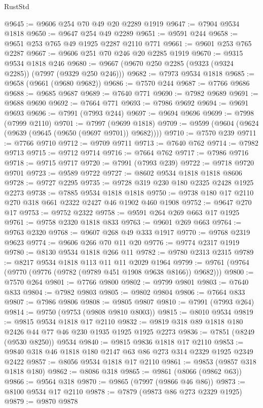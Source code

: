 \begin{lexlean}{RustStd}
\begin{coremodule}
{\begin{coremodule}
{{{{{{{{{{{{{{{{{{{{{{{{{{{{{{{{{{{{{{{{{{{@9645 := @9606 @254 @70 @49 @20 @2289 @1919
@9647 := @7904 @9534 @1818
@9650 := @9647 @254 @49 @2289
@9651 := @9591 @244
@9658 := @9651 @253 @765 @49 @1925 @2287 @2110 @771
@9661 := @9601 @253 @765 @2287
@9667 := @9606 @251 @70 @246 @20 @2285 @1919
@9670 := @9315 @9534 @1818 @246
@9680 := @9667 (@9670 @250 @2285 (@9323 (@9324 @2285)) (@7997 (@9329 @250 @246)))
@9682 := @7973 @9534 @1818
@9685 := @9658 (@9661 (@9680 @9682))
@9686 := @7570 @244
@9687 := @7766 @9686
@9688 := @9685 @9687
@9689 := @7640 @771
@9690 := @7982 @9689
@9691 := @9688 @9690
@9692 := @7664 @771
@9693 := @7986 @9692
@9694 := @9691 @9693
@9696 := @7991 (@7993 @244)
@9697 := @9694 @9696
@9699 := @7998 (@7999 @2110)
@9701 := @7997 (@9699 @1818)
@9709 := @9599 (@9604 (@9624 (@9639 (@9645 (@9650 (@9697 @9701)) @9682))))
@9710 := @7570 @239
@9711 := @7766 @9710
@9712 := @9709 @9711
@9713 := @7640 @762
@9714 := @7982 @9713
@9715 := @9712 @9714
@9716 := @7664 @762
@9717 := @7986 @9716
@9718 := @9715 @9717
@9720 := @7991 (@7993 @239)
@9722 := @9718 @9720 @9701
@9723 := @9589 @9722
@9727 := @8602 @9534 @1818 @1818 @8606
@9728 := @9727 @2295
@9735 := @9728 @319 @230 @180 @2325 @2428 @1925 @2273
@9738 := @7885 @9534 @1818 @1818
@9750 := @9738 @180 @17 @2110 @270 @318 @661 @2322 @2427 @46 @1902 @460 @1908
@9752 := @9647 @270 @17
@9753 := @9752 @2322
@9758 := @9591 @264 @269 @663 @17 @1925
@9761 := @9758 @2320 @1818 @833
@9763 := @9601 @269 @663
@9764 := @9763 @2320
@9768 := @9607 @268 @49 @333 @1917
@9770 := @9768 @2319 @9623
@9774 := @9606 @266 @70 @11 @20
@9776 := @9774 @2317 @1919
@9780 := @8130 @9534 @1818 @266 @11
@9782 := @9780 @2313 @2315
@9789 := @8217 @9534 @1818 @113 @11 @11 @2029 @1964
@9799 := @9761 (@9764 (@9770 (@9776 (@9782 (@9789 @451 @1908 @9638 @8166)) @9682)))
@9800 := @7570 @264
@9801 := @7766 @9800
@9802 := @9799 @9801
@9803 := @7640 @833
@9804 := @7982 @9803
@9805 := @9802 @9804
@9806 := @7664 @833
@9807 := @7986 @9806
@9808 := @9805 @9807
@9810 := @7991 (@7993 @264)
@9814 := @9750 (@9753 (@9808 @9810 @8003))
@9815 := @8010 @9534
@9819 := @9815 @9534 @1818 @17 @2110
@9832 := @9819 @318 @89 @1818 @180 @2426 @44 @77 @46 @230 @1935 @1925 @1925 @2273
@9836 := @7851 (@8249 (@9530 @8250)) @9534
@9840 := @9815 @9836 @1818 @17 @2110
@9853 := @9840 @318 @46 @1818 @180 @2147 @63 @86 @273 @314 @2329 @1925 @2349 @2422
@9857 := @8056 @9534 @1818 @17 @2110
@9861 := @9853 (@9857 @318 @1818 @180)
@9862 := @8086 @318
@9865 := @9861 (@8066 (@9862 @63))
@9866 := @9564 @318
@9870 := @9865 (@7997 (@9866 @46 @86))
@9873 := @8100 @9534 @17 @2110
@9878 := @7879 (@9873 @86 @273 @2329 @1925)
@9879 := @9870 @9878
}}}}}}}}}}}}}}}}}}}}}}}}}}}}}}}}}}}}}}}}}}}
\end{coremodule}}
\end{coremodule}
\end{lexlean}
